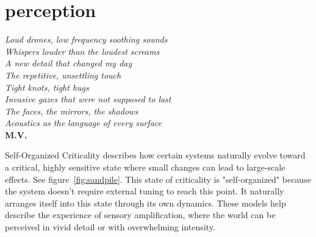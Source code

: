 \chapter*{perception}
\begin{center}
\vspace{2cm}
\begin{flushright}
\textit{Loud drones, low frequency soothing sounds\\Whispers louder than the loudest screams\\A new detail that changed my day\\The repetitive, unsettling touch\\Tight knots, tight hugs\\Invasive gazes that were not supposed to last\\The faces, the mirrors, the shadows\\Acoustics as the language of every surface}\\
\textbf{M.V.} 
\end{flushright}
\vspace{2cm}
\end{center}
\normalsize

\newpage  %
Self-Organized Criticality describes how certain systems naturally evolve toward a critical, highly sensitive state where small changes can lead to large-scale effects. See figure~\ref{fig:sandpile}. This state of criticality is "self-organized" because the system doesn't require external tuning to reach this point. It naturally arranges itself into this state through its own dynamics. These models help describe the experience of sensory amplification, where the world can be perceived in vivid detail or with overwhelming intensity. \citep{adami1993}


